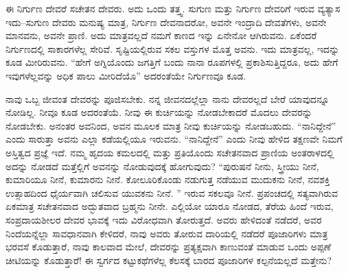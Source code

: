 ಈ ನಿರ್ಗುಣ ದೇವರೆ ಸಚೇತನ ದೇವರು. ಅದು ಒಂದು ತತ್ತ್ವ. ಸುಗುಣ ಮತ್ತು ನಿರ್ಗುಣ ದೇವರಿಗೆ ಇರುವ ವ್ಯತ್ಯಾಸ ಇದು–ಸುಗುಣ ದೇವರು ಮನುಷ್ಯ ಮಾತ್ರ, ನಿರ್ಗುಣ ದೇವನಾದರೋ, ಅವನೇ ಇಂದ್ರಾದಿ ದೇವತೆಗಳು, ಅವನೇ ಮಾನವನು, ಅವನೇ ಪ್ರಾಣಿ. ಅದು ಮಾತ್ರವಲ್ಲದೆ ನಮಗೆ ಕಾಣದ ಇನ್ನು ಏನೇನೋ ಆಗಿರುವನು. ಏಕೆಂದರೆ ನಿರ್ಗುಣದಲ್ಲಿ ಸಾಕಾರಗಳೆಲ್ಲ ಸೇರಿವೆ. ಸೃಷ್ಟಿಯಲ್ಲಿರುವ ಸಕಲ ವಸ್ತುಗಳ ಮೊತ್ತ ಅವನು. ಇದು ಮಾತ್ರವಲ್ಲ, ಇದನ್ನು ಕೂಡ ಮೀರಿರುವನು. “ಹೇಗೆ ಅಗ್ನಿಯೊಂದು ಜಗತ್ತಿಗೆ ಬಂದು ನಾನಾ ರೂಪಗಳಲ್ಲಿ ಪ್ರಕಾಶಿಸುತ್ತಿದ್ದರೂ, ಅದು ಹೇಗೆ ಇವುಗಳೆಲ್ಲವನ್ನು ಅಧಿಕ ಪಾಲು ಮೀರಿದೆಯೊ” ಅದರಂತೆಯೇ ನಿರ್ಗುಣವೂ ಕೂಡ. 

\vskip 6pt

ನಾವು ಒಬ್ಬ ಜೀವಂತ ದೇವರನ್ನು ಪೂಜಿಸಬೇಕು. ನನ್ನ ಜೀವನದಲ್ಲೆಲ್ಲಾ ನಾನು ದೇವರಲ್ಲದೆ ಬೇರೆ ಯಾವುದನ್ನೂ ನೋಡಿಲ್ಲ. ನೀವೂ ಕೂಡ ಅದರಂತೆಯೆ. ನೀವು ಈ ಕುರ್ಚಿಯನ್ನು ನೋಡಬೇಕಾದರೆ ಮೊದಲು ದೇವರನ್ನು ನೋಡಬೇಕು. ಅನಂತರ ಅವನಿಂದ, ಅವನ ಮೂಲಕ ಮಾತ್ರ ನೀವು ಕುರ್ಚಿಯನ್ನು ನೋಡಬಹುದು. “ನಾನಿದ್ದೇನೆ” ಎಂದು ಸಾರುತ್ತಾ ಅವನು ಎಲ್ಲಾ ಕಡೆಯಲ್ಲಿಯೂ ಇರುವನು. “ನಾನಿದ್ದೇನೆ” ಎಂದು ನೀವು ಹೇಳಿದ ತಕ್ಷಣವೇ ನಿಮಗೆ ಅಸ್ತಿತ್ವದ ಪ್ರಜ್ಞೆ ಇದೆ. ನಮ್ಮ ಹೃದಯ ಕಮಲದಲ್ಲಿ ಮತ್ತು ಪ್ರತಿಯೊಂದು ಸಚೇತನವಾದ ಪ್ರಾಣಿಯ ಅಂತರಾಳದಲ್ಲಿ ಅದನ್ನು ನೋಡದೆ ಮತ್ತೆಲ್ಲಿಗೆ ಅವನನ್ನು ನೋಡುವುದಕ್ಕೆ ಹೋಗುವುದು? “ಪುರುಷನೆ ನೀನು, ಸ್ತ್ರೀಯು ನೀನೆ, ಕುಮಾರಿಯೂ ನೀನೆ, ಕುಮಾರನು ನೀನೆ. ಕೋಲೂರಿಕೊಂಡು ನಡುಗುತ್ತ ನಡೆಯುವ ಮುದುಕನು ನೀನೆ, ನವಶಕ್ತಿ ಉತ್ಸಾಹದಿಂದ ಧೈರ್ಯವಾಗಿ ಚಲಿಸುವ ಯುವಕನು ನೀನೆ. ” ಇರುವ ಸಕಲವೂ ನೀನೆ. ಪ್ರಪಂಚದಲ್ಲಿ ಸತ್ಯವಾಗಿರುವ ಏಕಮಾತ್ರ ಸಚೇತನವಾದ ಅದ್ಭುತವಾದ ಬ್ರಹ್ಮನು ನೀನೇ. ಎಲ್ಲಿಯೋ ಯಾರೂ ನೋಡದ, ತೆರೆಯ ಹಿಂದೆ ಇರುವ, ಸಂಪ್ರದಾಯಶೀಲರ ದೇವರ ಭಾವಕ್ಕೆ ಇದು ವಿರೋಧವಾಗಿ ತೋರುತ್ತದೆ. ಅವರು ಹೇಳಿದಂತೆ ನಡೆದರೆ, ಅವರ ನಿಂದೆಯನ್ನೆಲ್ಲಾ ಸಾವಧಾನವಾಗಿ ಕೇಳಿದರೆ, ನಾವು ಅವರು ತೋರುವ ದಾರಿಯಲ್ಲಿ ನಡೆದರೆ ಪೂಜಾರಿಗಳು ಮಾತ್ರ ಭರವಸೆ ಕೊಡುತ್ತಾರೆ, ನಾವು ಕಾಲವಾದ ಮೇಲೆ, ದೇವರನ್ನು ಪ್ರತ್ಯಕ್ಷವಾಗಿ ಕಾಣುವಂತೆ ಮಾಡುವ ಒಂದು ಅಪ್ಪಣೆ ಚೀಟಿಯನ್ನು ಕೊಡುತ್ತಾರೆ! ಈ ಸ್ವರ್ಗದ ಕಟ್ಟುಕಥೆಗಳೆಲ್ಲ ಕೆಲಸಕ್ಕೆ ಬಾರದ ಪೂಜಾರಿಗಳ ಕಲ್ಪನೆಯಲ್ಲದೆ ಮತ್ತೇನು?

\vskip 6pt

